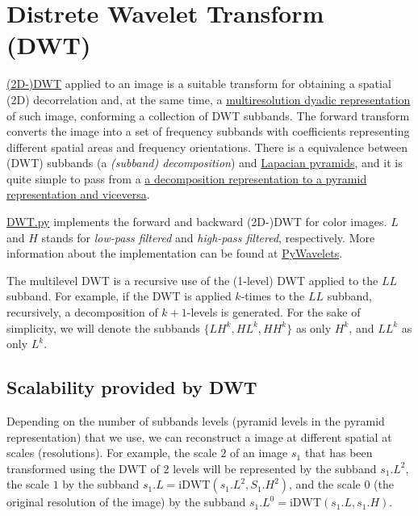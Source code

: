 \section{Distrete Wavelet Transform (DWT)}
\href{https://en.wikipedia.org/wiki/Discrete_wavelet_transform}{(2D-)DWT}
applied to an image is a suitable transform for obtaining a spatial
(2D) decorrelation and, at the same time, a
\href{https://vicente-gonzalez-ruiz.github.io/image_transformations_for_coding/indexse24.html#x34-3400024}{multiresolution
  dyadic representation} of such image, conforming a collection of DWT
subbands. The forward transform converts the image into a set of
frequency subbands with coefficients representing different spatial
areas and frequency orientations. There is a equivalence between (DWT)
subbands (a \emph{(subband) decomposition}) and
\href{https://en.wikipedia.org/wiki/Pyramid_(image_processing)#Laplacian_pyramid}{Lapacian
  pyramids}, and it is quite simple to pass from a
\href{https://vicente-gonzalez-ruiz.github.io/pyramids-and-wavelets/}{a
  decomposition representation to a pyramid representation and
  viceversa}.

\href{https://github.com/vicente-gonzalez-ruiz/MCDWT/blob/master/src/DWT.py}{DWT.py}
implements the forward and backward (2D-)DWT for color images. $L$ and
$H$ stands for \emph{low-pass filtered} and \emph{high-pass filtered},
respectively.  More information about the implementation can be found at
\href{https://pywavelets.readthedocs.io/en/latest/index.html}{PyWavelets}.



The multilevel DWT is a recursive use of the (1-level) DWT applied to
the $LL$ subband. For example, if the DWT is applied $k$-times to the
$LL$ subband, recursively, a decomposition of $k+1$-levels is generated. For
the sake of simplicity, we will denote the subbands $\{LH^k, HL^k,
HH^k\}$ as only $H^k$, and $LL^k$ as only $L^k$.

\subsection{Scalability provided by DWT}
Depending on the number of subbands levels (pyramid levels in the
pyramid representation) that we use, we can reconstruct a image at
different spatial at scales (resolutions). For example, the scale $2$
of an image $s_1$ that has been transformed using the DWT of 2 levels
will be represented by the subband $s_1.L^2$, the scale $1$ by the
subband $s_1.L=\text{iDWT}(s_1.L^2, S_1.H^2)$, and the scale $0$ (the
original resolution of the image) by the subband
$s_1.L^0=\text{iDWT}(s_1.L, s_1.H)$.

